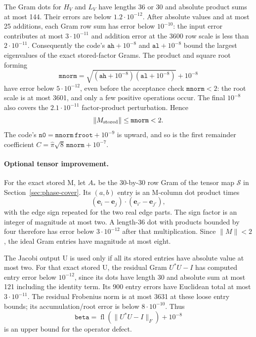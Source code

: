 The Gram dots for $H_V$ and $L_V$ have lengths 36 or 30 and absolute
product sums at most 144.  Their errors are below $1.2\cdot10^{-12}$.
After absolute values and at most 25 additions, each Gram row sum
has error below $10^{-10}$: the input error contributes at most
$3\cdot10^{-11}$ and addition error at the 3600 row scale is less
than $2\cdot10^{-11}$.  Consequently the code's
$\mathtt{ah}+10^{-8}$ and $\mathtt{al}+10^{-8}$ bound the largest
eigenvalues of the exact stored-factor Grams.
The product and square root forming
\begin{equation}\label{round:mnorm}
 \mathtt{mnorm}=
  \sqrt{(\mathtt{ah}+10^{-8})(\mathtt{al}+10^{-8})}+10^{-8}
\end{equation}
have error below $5\cdot10^{-12}$, even before the acceptance check
$\mathtt{mnorm}<2$: the root scale is at most 3601, and only a few
positive operations occur.  The final $10^{-8}$ also covers the
$2.1\cdot10^{-11}$ factor-product perturbation.  Hence
\[
 \|M_{\rm stored}\|\le\mathtt{mnorm}<2.
\]
The code's $\mathtt{n0}=\mathtt{mnorm}\,\mathtt{froot}+10^{-9}$
is upward, and so is the first remainder coefficient
$C=\widehat\pi\sqrt8\,\mathtt{mnorm}+10^{-7}$.

\paragraph{Optional tensor improvement.}
For the exact stored M, let $A_*$ be the $30$-by-$30$ row Gram of
the tensor map $\mathcal S$ in Section~\ref{sec:phase-cover}.
Its $(a,b)$ entry is an M-column dot product times
\[
 (\mathbf e_i-\mathbf e_j)\mathbin{\cdot}
 (\mathbf e_{i'}-\mathbf e_{j'}),
\]
with the edge sign repeated for the two real edge parts.  The sign
factor is an integer of magnitude at most two.  A length-36 dot with
products bounded by four therefore has error below
$3\cdot10^{-12}$ after that multiplication.  Since $\|M\|<2$,
the ideal Gram entries have magnitude at most eight.

The Jacobi output U is used only if all its stored entries have
absolute value at most two.  For that exact stored U, the residual
Gram $U^*U-I$ has computed entry error below $10^{-12}$, since its
dots have length 30 and absolute sum at most 121 including the
identity term.  Its 900 entry errors have Euclidean total at most
$3\cdot10^{-11}$.  The residual Frobenius norm is at most 3631 at
these loose entry bounds; its accumulation/root error is below
$8\cdot10^{-10}$.  Thus
\[
 \mathtt{beta}=\operatorname{fl}(\|U^*U-I\|_F)+10^{-8}
\]
is an upper bound for the operator defect.

